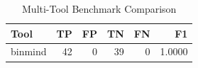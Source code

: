 \begin{table}[ht]
\centering
\caption{Multi-Tool Benchmark Comparison}
\label{tab:multitool}
\begin{tabular}{lrrrrr}
\toprule
Tool & TP & FP & TN & FN & F1 \\
\midrule
binmind & 42 & 0 & 39 & 0 & 1.0000 \\
\bottomrule
\end{tabular}
\end{table}
